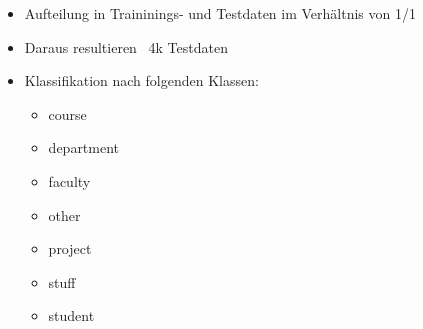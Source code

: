 \begin{frame}[c]
\begin{itemize}
  \item Aufteilung in Traininings- und Testdaten im Verhältnis von 1/1
  \item Daraus resultieren ~4k Testdaten
  \item Klassifikation nach folgenden Klassen:
  \begin{itemize}
  \item course
  \item department
  \item faculty
  \item other
  \item project
  \item stuff
  \item student
\end{itemize}
 
\end{itemize}
\end{frame}

